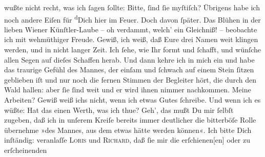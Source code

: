 \begin{ledgroupsized}[t]{13cm}
               wußte nicht recht, was {\pb}ich ſagen ſollte: Bitte,
               ſind ſie myſtiſch?\pend
           \pstart
           Übrigens habe ich noch andere Eiſen für \substVorne{}\textsuperscript{d}\substDazwischen{}D\substHinten{}ich hier im Feuer. Doch davon ſpäter.\pend
           \pstart
           Das Blühen in der lieben Wiener Künſtler-Laube –
               oh verdammt, welch’ ein Gleichniß! – beobachte ich mit wehmüthiger Freude. Gewiß, ich
               weiß, daß Eure drei Namen weit klingen werden, und in nicht langer Zeit. Ich ſehe, wie
                  Ihr formt und ſchafft, und wünſche allen Segen {\pb}auf dieſes Schaffen herab. Und dann kehre ich in
               mich ein und habe das traurige Gefühl des Mannes, der einſam und ſchwach auf einem
               Stein ſitzen geblieben iſt und nur noch die fernen Stimmen der Begleiter hört, die
               durch den Wald hallen: aber ſie ſind weit und er wird ihnen nimmer nachkommen. Meine
               Arbeiten? Gewiß weiß ichs nicht, wenn ich etwas Gutes ſchreibe. Und wenn ich es
               wüßte: Hat das einen Werth, was ich thue? Geh’, das mußt {\pb}Du mir ſelbſt zugeben, daß ich in unſerem Kreiſe
               bereits immer deutlicher die bitterböſe Rolle übernehme »des Mannes, aus dem etwas
               hätte werden können«.\pend
           \pstart
           Ich bitte Dich inſtändig: veranlaſſe \textsc{Loris} und \textsc{Richard}, daß ſie mir die erſchienen{[}en{]} oder zu erſcheinenden
                  \label{K_L02719-10v}
\end{ledgroupsized}
